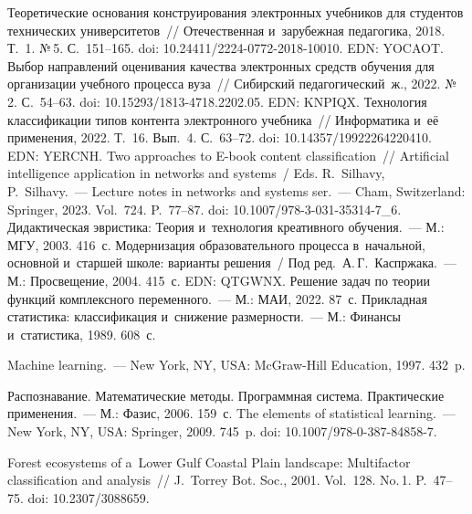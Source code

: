 \begin{multicols}{2}
{\small\frenchspacing
 {\baselineskip=10.6pt
 \begin{thebibliography}{99}
 Теоретические основания конструирования электронных 
учебников для студентов технических университетов~// Отечественная и~зарубежная 
педагогика, 2018. Т.~1. №\,5. С.~151--165. doi: 10.24411/2224-0772-2018-10010. EDN: YOCAOT.
 Выбор направлений оценивания 
качества электронных средств обучения для организации учебного процесса вуза~// 
Сибирский педагогический~ж., 2022. №\,2. С.~54--63. doi: 10.15293/1813-4718.2202.05.
EDN: \mbox{KNPIQX}.
 Технология классификации типов контента электронного 
учебника~// Информатика и~её применения, 2022. Т.~16. Вып.~4. С.~63--72. doi: 
10.14357/19922264220410. EDN: YERCNH.
 Two approaches to E-book content classification~// Artificial 
intelligence application in networks and systems~/ Eds. R.~Silhavy, P.~Silhavy.~--- Lecture notes in networks and systems 
ser.~--- Cham, Switzerland: Springer, 2023. Vol.~724. P.~77--87. doi:  
10.1007/978-3-031-35314-7\_6.
 Дидактическая эвристика: Теория и~технология креативного 
обучения.~--- М.: МГУ, 2003. 416~с.
Модернизация образовательного процесса в~начальной, основной и~старшей школе: 
варианты решения~/ Под ред.\ А.\,Г.~Каспржака.~--- М.: Просвещение, 2004. 415~с. EDN: QTGWNX.
 Решение задач по теории функций комплексного 
переменного.~--- М.: МАИ, 2022. 87~с.
 Прикладная 
статистика: классификация и~снижение размерности.~--- М.: Финансы и~статистика, 1989. 
608~с.

 Machine learning.~--- New York, NY, USA: McGraw-Hill Education, 1997. 
432~p.

 Распознавание. Математические 
методы. Программная сис\-те\-ма. Практические применения.~--- М.: Фазис, 2006. 
159~с.
 The elements of statistical learning.~--- New York, 
NY, USA: Springer, 2009. 745~p. doi: 10.1007/978-0-387-84858-7.

Forest ecosystems of a~Lower Gulf Coastal Plain landscape: Multifactor classification and 
analysis~// J.~Torrey Bot. Soc., 2001. Vol.~128. No.\,1. P.~47--75. doi: 
10.2307/3088659.



\end{thebibliography}}}
\end{multicols}
